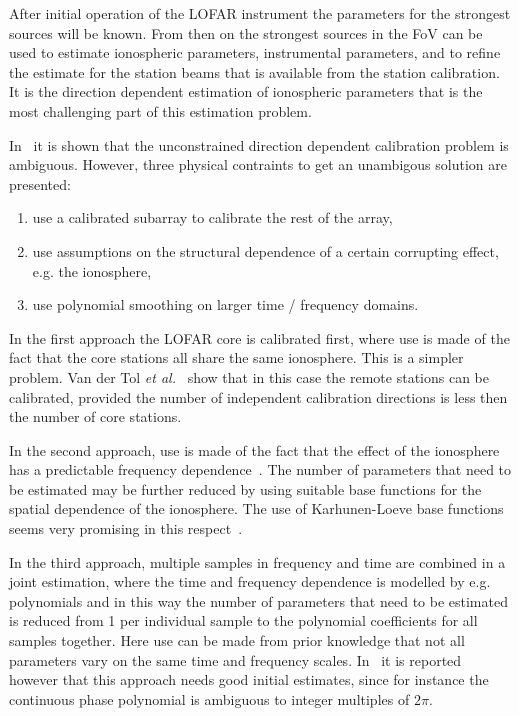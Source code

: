 \documentclass[journal]{IEEEtran}
\begin{document}
After initial operation of the LOFAR instrument the parameters for the strongest sources will be known. From then on the strongest sources in the FoV can be used to estimate ionospheric parameters, instrumental parameters, and to refine the estimate for the station beams that is available from the station calibration. It is the direction dependent estimation of ionospheric parameters that is the most challenging part of this estimation problem. 

In~\cite{Tol:07} it is shown that the unconstrained direction dependent calibration problem is ambiguous. However, three physical contraints to get an unambigous solution are presented: 
%
\begin{enumerate}
\item use a calibrated subarray to calibrate the rest of the array,
\item use assumptions on the structural dependence of a certain corrupting effect, e.g. the ionosphere,
\item use polynomial smoothing on larger time / frequency domains.
\end{enumerate}
% 

In the first approach the LOFAR core is calibrated first, where use is made of the fact that the core stations all share the same ionosphere. This is a simpler problem. Van der Tol {\it et al.}~\cite{Tol:07,Tol:05} show that in this case the remote stations can be calibrated, provided the number of independent calibration directions is less then the number of core stations. 

In the second approach, use is made of the fact that the effect of the ionosphere has a predictable frequency dependence~\cite{Tol:05}. The number of parameters that need to be estimated may be further reduced by using suitable base functions for the spatial dependence of the ionosphere. The use of Karhunen-Loeve base functions seems very promising in this respect~\cite{Tol2:07}.  

In the third approach, multiple samples in frequency and time are combined in a joint estimation, where the time and frequency dependence is modelled by e.g. polynomials and in this way the number of parameters that need to be estimated is reduced from 1 per individual sample to the polynomial coefficients for all samples together. Here use can be made from prior knowledge that not all parameters vary on the same time and frequency scales. In~\cite{Tol:07} it is reported however that this approach needs good initial estimates, since for instance the continuous phase polynomial is ambiguous to integer multiples of $2\pi$.
\end{document}
